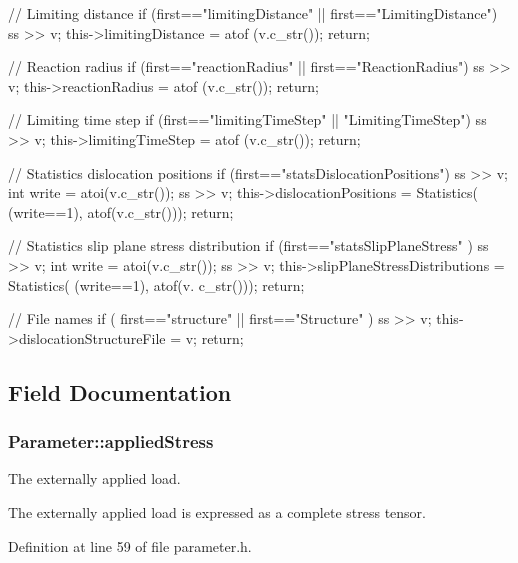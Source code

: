 \begin{DoxyCode}
{    // Limiting distance
    if (first=="limitingDistance" || first=="LimitingDistance")
    {
        ss >> v;
        this->limitingDistance = atof (v.c_str());
        return;
    }

    // Reaction radius
    if (first=="reactionRadius" || first=="ReactionRadius")
    {
        ss >> v;
        this->reactionRadius = atof (v.c_str());
        return;
    }

    // Limiting time step
    if (first=="limitingTimeStep" || "LimitingTimeStep")
    {
        ss >> v;
        this->limitingTimeStep = atof (v.c_str());
        return;
    }

    // Statistics dislocation positions
    if (first=="statsDislocationPositions")
    {
        ss >> v;
        int write = atoi(v.c_str());
        ss >> v;
        this->dislocationPositions = Statistics( (write==1), atof(v.c_str()));
        return;
    }

    // Statistics slip plane stress distribution
    if (first=="statsSlipPlaneStress" )
    {
        ss >> v;
        int write = atoi(v.c_str());
        ss >> v;
        this->slipPlaneStressDistributions = Statistics( (write==1), atof(v.
      c_str()));
        return;
    }

    // File names
    if ( first=="structure" || first=="Structure" )
    {
        ss >> v;
        this->dislocationStructureFile = v;
        return;
    }

}
\end{DoxyCode}


\subsection{\-Field \-Documentation}
\hypertarget{classParameter_a6027d6a064f705b3f95d194ff18f0cdd}{
\subsubsection[{applied\-Stress}]{ {\bf \-Parameter\-::applied\-Stress}}}\label{dc/dab/classParameter_a6027d6a064f705b3f95d194ff18f0cdd}


\-The externally applied load. 

\-The externally applied load is expressed as a complete stress tensor. 

\-Definition at line 59 of file parameter.\-h.

